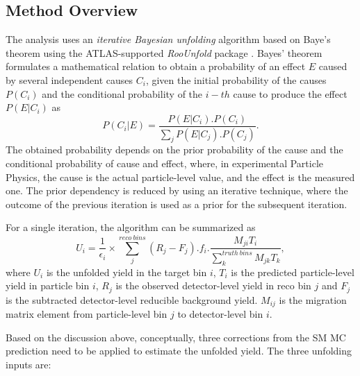 \subsection{Method Overview}
\label{subsec:UnfoldingOverview}
The analysis uses an \textit{iterative Bayesian unfolding} algorithm based on Baye's theorem \cite{BayesianUnfolding} \cite{Improved_BayesianUnfolding} using the ATLAS-supported \textit{RooUnfold} package \cite{RooUnfold}. Bayes' theorem formulates a mathematical relation to obtain a probability of an effect $E$ caused by several independent causes $C_{i}$, given the initial probability of the causes $P(C_{i})$ and the conditional probability of the $i-th$ cause to produce the effect $P(E|C_{i})$ as 
\begin{equation}
P(C_{i}|E) = \frac{ P(E|C_{i}) . P(C_{i}) } { \sum_{j}{ P(E|C_{j}).P(C_{j}) } }.
\label{eqn:BayesTheorem}
\end{equation}
The obtained probability depends on the prior probability of the cause and the conditional probability of cause and effect, where, in experimental Particle Physics, the cause is the actual particle-level value, and the effect is the measured one. The prior dependency is reduced by using an iterative technique, where the outcome of the previous iteration is used as a prior for the subsequent iteration.

For a single iteration, the algorithm can be summarized as 
\begin{equation}
    U_{i} = \frac{1}{ \epsilon_{i} } \times \sum^{reco~bins}_{j}{ (R_j -F_j ) . f_{i} . \frac{M_{ji} T_{i}}{ \sum_{k}^{truth~bins}{M_{jk} T_{k}}} },
    \label{eqn:BayesianUnfolding}
\end{equation}
where $U_{i}$ is the unfolded yield in the target bin $i$, $T_{i}$ is the predicted particle-level yield in particle bin $i$, $R_{j}$ is the observed detector-level yield in reco bin $j$ and $F_{j}$ is the subtracted detector-level reducible background yield. $M_{ij}$ is the migration matrix element from particle-level bin $j$ to detector-level bin $i$. 

Based on the discussion above, conceptually, three corrections from the SM MC prediction need to be applied to estimate the unfolded yield. The three unfolding inputs are: 

